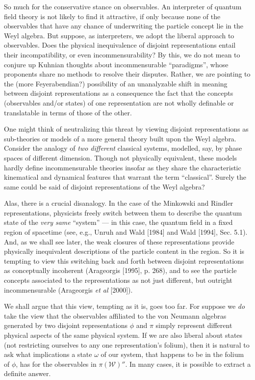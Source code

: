 \documentclass[12pt]{article}
\theoremstyle{remark}
\theoremstyle{definition}
\newcommand{\alg}[1]{\mathcal{#1}}
\begin{document}
So much for the conservative stance on observables.  An interpreter
of quantum field theory is not likely to find it
attractive, if only because none of the observables that have any
chance of underwriting the particle concept lie in the Weyl algebra.
But suppose, as interpreters, we adopt the liberal approach to observables.  Does the
physical inequivalence of disjoint representations entail their
incompatibility, or even incommensurability?  By this, we do not mean
to conjure up Kuhnian thoughts about incommensurable ``paradigms'',
whose proponents share no methods to resolve their disputes.  Rather,
we are pointing to the (more Feyerabendian?)  possibility of an
unanalyzable shift in meaning between disjoint representations as a
consequence the fact that the concepts (observables and/or states) of
one representation are not wholly definable or translatable in terms
of those of the other.
 
One might think of neutralizing this threat by viewing disjoint
representations as sub-theories or models of a more general theory
built upon the Weyl algebra.  Consider the analogy of \emph{two
  different} classical systems, modelled, say, by phase spaces of
different dimension.  Though not physically equivalent, these models
hardly define incommensurable theories insofar as they share the
characteristic kinematical and dynamical features that warrant the
term ``classical''.  Surely the same could be said of disjoint
representations of the Weyl algebra?
 
Alas, there is a crucial disanalogy.  In the case of the Minkowski and
Rindler representations, physicists freely switch between them to
describe the quantum state of the \emph{very same} ``system'' --- in
this case, the quantum field in a fixed region of spacetime (see,
e.g., Unruh and Wald [1984] and Wald [1994], Sec. 5.1). And, as we
shall see later, the weak closures of these representations provide
physically inequivalent descriptions of the particle content in the
region.  So it is tempting to view this switching back and forth
between disjoint representations as conceptually incoherent
(Arageorgis [1995], p. 268), and to see the particle concepts
associated to the representations as not just different, but outright
incommensurable (Arageorgis \emph{et al} [2000]).
  
We shall argue that this view, tempting as it is, goes too far.  For
suppose we \emph{do} take the view that the observables affiliated to
the von Neumann algebras generated by two disjoint representations
$\phi$ and $\pi$ simply represent different physical aspects of the same
physical system.  If we are also liberal about states (not restricting
ourselves to any one representation's folium), then it is natural to
ask what implications a state $\omega$ of our system, that happens to
be in the folium of $\phi$, has for the observables in
$\pi(\alg{W})''$.  In many cases, it is possible to extract a definite
answer.
  
\end{document}
